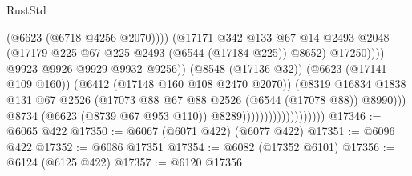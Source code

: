 \begin{lexlean}{RustStd}
\begin{coremodule}
                                                          (@6623 (@6718 @4256 @2070))))
                                                      (@17171
                                                        @342
                                                        @133
                                                        @67
                                                        @14
                                                        @2493
                                                        @2048
                                                        (@17179
                                                          @225
                                                          @67
                                                          @225
                                                          @2493
                                                          (@6544 (@17184 @225))
                                                          @8652)
                                                        @17250))))
                                                @9923
                                                @9926
                                                @9929
                                                @9932
                                                @9256))
                                            (@8548 (@17136 @32))
                                            (@6623 (@17141 @109 @160))
                                            (@6412 (@17148 @160 @108 @2470 @2070))
                                            (@8319
                                              @16834
                                              @1838
                                              @131
                                              @67
                                              @2526
                                              (@17073
                                                @88
                                                @67
                                                @88
                                                @2526
                                                (@6544 (@17078 @88))
                                                @8990)))
                                          @8734
                                          (@6623 (@8739 @67 @953 @110))
                                          @8289)))))))))))))))))))
@17346 := @6065 @422
@17350 := @6067 (@6071 @422) (@6077 @422)
@17351 := @6096 @422
@17352 := @6086 @17351
@17354 := @6082 (@17352 @6101)
@17356 := @6124 (@6125 @422)
@17357 := @6120 @17356

\end{coremodule}
\end{lexlean}
